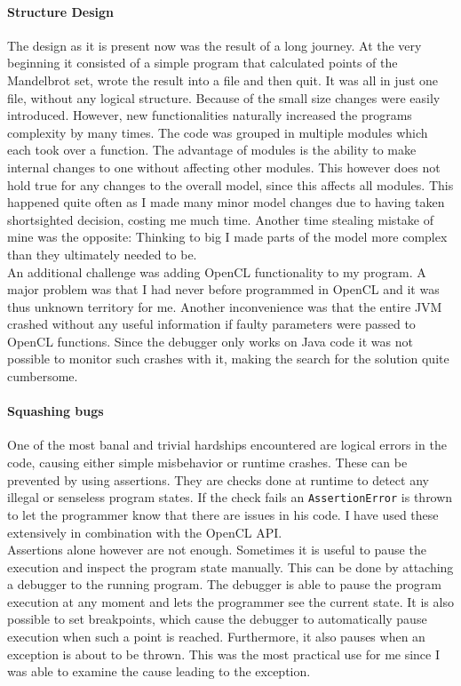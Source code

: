 \documentclass[10pt,a4paper,titlepage]{article}
\begin{document}
	\paragraph{Structure Design}
	The design as it is present now was the result of a long journey. At the very beginning it consisted of a simple program that calculated points of the Mandelbrot set, wrote the result into a file and then quit. It was all in just one file, without any logical structure. Because of the small size changes were easily introduced. However, new functionalities naturally increased the programs complexity by many times. The code was grouped in multiple modules which each took over a function. The advantage of modules is the ability to make internal changes to one without affecting other modules. This however does not hold true for any changes to the overall model, since this affects all modules. This happened quite often as I made many minor model changes due to having taken shortsighted decision, costing me much time. Another time stealing mistake of mine was the opposite: Thinking to big I made parts of the model more complex than they ultimately needed to be.\\
	An additional challenge was adding OpenCL functionality to my program. A major problem was that I had never before programmed in OpenCL and it was thus unknown territory for me. Another inconvenience was that the entire JVM crashed without any useful information if faulty parameters were passed to OpenCL functions. Since the debugger only works on Java code it was not possible to monitor such crashes with it, making the search for the solution quite cumbersome.
	\paragraph{Squashing bugs}
	One of the most banal and trivial hardships encountered are logical errors in the code, causing either simple misbehavior or runtime crashes. These can be prevented by using assertions. They are checks done at runtime to detect any illegal or senseless program states. If the check fails an \verb|AssertionError| is thrown to let the programmer know that there are issues in his code. I have used these extensively in combination with the OpenCL API.\\
	Assertions alone however are not enough. Sometimes it is useful to pause the execution and inspect the program state manually. This can be done by attaching a debugger to the running program. The debugger is able to pause the program execution at any moment and lets the programmer see the current state. It is also possible to set breakpoints, which cause the debugger to automatically pause execution when such a point is reached. Furthermore, it also pauses when an exception is about to be thrown. This was the most practical use for me since I was able to examine the cause leading to the exception.
\end{document}
